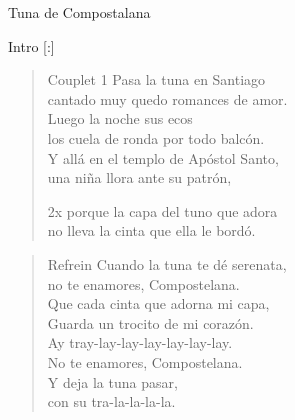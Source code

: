 \begin{song}{Tuna de Compostalana}
\small
\begin{instrumental}{Intro}
[:]
\end{instrumental}

\begin{verse}{Couplet 1}
\hspace{4em}Pasa la tuna en Santiago\\
cantado muy quedo romances de amor.\\
\hspace{4em}Luego la noche sus ecos\\
los cuela de ronda por todo balcón.\\
Y allá en el templo de Apóstol Santo,\\
una niña llora ante su patrón,\\
\begin{sidenote}{2x}
porque la capa del tuno que adora\\
no lleva la cinta que ella le bordó. 
\end{sidenote}
\end{verse}

\begin{verse}{Refrein}
Cuando la tuna te dé serenata,\\
no te enamores, Compostelana.\\
Que cada cinta que adorna mi capa,\chord{}\\
Guarda un trocito de mi corazón.\hspace{1em}\\
Ay tray-lay-lay-lay-lay-lay-lay.\\
No te enamores, Compostelana. \\
Y deja la tuna pasar,\\
con su tra-la-la-la-la.\\
\end{verse}


\end{song}
